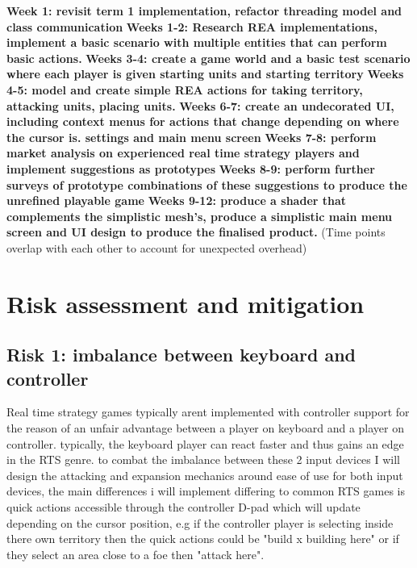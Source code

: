 \documentclass{article}
\begin{document}
\textbf{Week 1: revisit term 1 implementation, refactor threading model and class communication} \newline
\textbf{Weeks 1-2: Research REA implementations, implement a basic scenario with multiple entities that can perform basic actions. } \newline
\textbf{Weeks 3-4: create a game world and a basic test scenario where each player is given starting units and starting territory} \newline
\textbf{Weeks 4-5: model and create simple REA actions for taking territory, attacking units, placing units.} \newline
\textbf{Weeks 6-7: create an undecorated UI, including context menus for actions that change depending on where the cursor is. settings and main menu screen} \newline
\textbf{Weeks 7-8: perform market analysis on experienced real time strategy players and implement suggestions as prototypes} \newline
\textbf{Weeks 8-9: perform further surveys of prototype combinations of these suggestions to produce the unrefined playable game} \newline
\textbf{Weeks 9-12: produce a shader that complements the simplistic mesh's, produce a simplistic main menu screen and UI design to produce the finalised product.}  \newline
(Time points overlap with each other to account for unexpected overhead)

\newpage
\section{Risk assessment and mitigation}

\subsection{Risk 1: imbalance between keyboard and controller}
Real time strategy games typically arent implemented with controller support for the reason of an unfair advantage between a player on keyboard and a player on controller. typically, the keyboard player can react faster and thus gains an edge in the RTS genre. to combat the imbalance between these 2 input devices I will design the attacking and expansion mechanics around ease of use for both input devices, the main differences i will implement differing to common RTS games is quick actions accessible through the controller D-pad which will update depending on the cursor position, e.g if the controller player is selecting inside there own territory then the quick actions could be "build x building here" or if they select an area close to a foe then "attack here".
\end{document}
